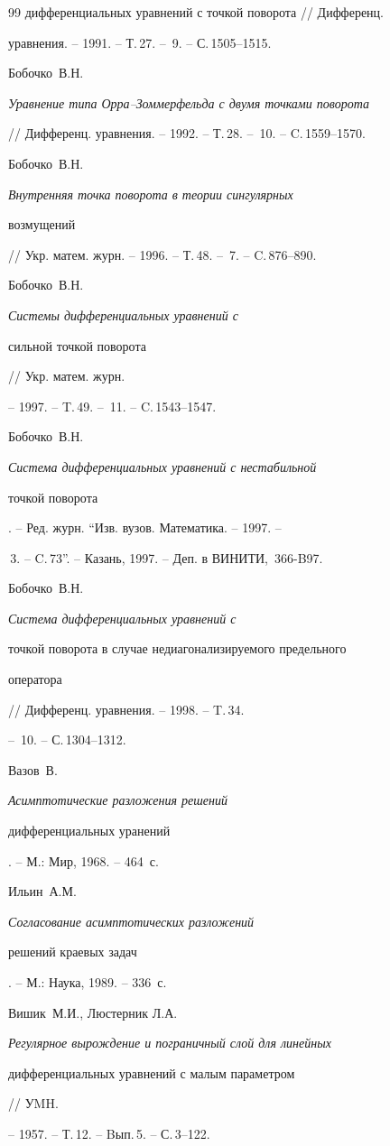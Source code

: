 \begin{thebibliography}{99}
{дифференциальных уравнений с точкой поворота } // Дифференц.


уравнения. -- 1991. -- Т.\,27. -- \No\,9. -- С.\,1505--1515.




Бобочко~В.Н. {\it Уравнение типа Орра--Зоммерфельда с двумя точками поворота


} // Дифференц. уравнения. -- 1992. -- Т.\,28. -- \No\,10. -- C.\,1559--1570.




Бобочко~В.Н. {\it Внутренняя точка поворота в теории сингулярных


возмущений}


 // Укр. матем. журн. -- 1996. -- Т.\,48. -- \No\,7. -- C.\,876--890.




Бобочко~В.Н. {\it Системы дифференциальных уравнений с


сильной точкой поворота} // Укр. матем. журн.


-- 1997. -- T.\,49. -- \No\,11. -- C.\,1543--1547.




Бобочко~В.Н. {\it Система дифференциальных уравнений с нестабильной


точкой поворота}. -- Ред. журн. ``Изв. вузов. Математика. -- 1997. --


\No\,3. -- C.\,73''. -- Казань, 1997. -- Деп. в ВИНИТИ, \No\,366-B97.




Бобочко~В.Н. { \it Система дифференциальных уравнений с


точкой поворота в случае недиагонализируемого предельного


оператора} // Дифференц. уравнения. -- 1998. -- T.\,34.


-- \No\,10. -- С.\,1304--1312.




Вазов~В. {\it Асимптотические разложения решений


дифференциальных уранений }. -- М.: Мир, 1968. -- 464~с.




Ильин~А.М. {\it Согласование асимптотических разложений


решений краевых задач}. -- М.: Наука, 1989. -- 336~с.




Вишик~М.И., Люстерник Л.А.


{\it Регулярное вырождение и пограничный слой для линейных


дифференциальных уравнений с малым параметром } // УMH.


-- 1957. -- Т.\,12. -- Bып.\,5. -- С.\,3--122.





\end{thebibliography}





